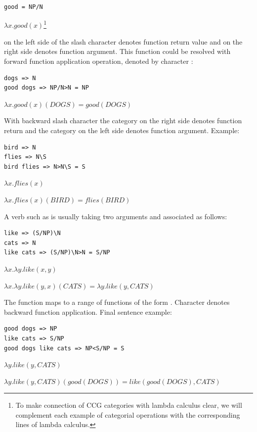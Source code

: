 \begin{verbatim}
good = NP/N 
\end{verbatim}

$\lambda x.good(x)$\footnote{To make connection of CCG categories with lambda calculus clear, we will complement each example of categorial operations with the corresponding lines of lambda calculus.}

 on the left side of the slash character denotes function return value and  on the right side denotes function argument. This function could be resolved with forward function application operation, denoted by character \code{>}:

\begin{verbatim}
dogs => N
good dogs => NP/N>N = NP
\end{verbatim}

$\lambda x.good(x)(DOGS)=good(DOGS)$

With backward slash character \code{\textbackslash} the category on the right side denotes function return and the category on the left side denotes function argument. Example:

\begin{verbatim}
bird => N
flies => N\S
bird flies => N>N\S = S
\end{verbatim}

$\lambda x.flies(x)$

$\lambda x.flies(x)(BIRD)=flies(BIRD) $

A verb such as  is usually taking two arguments and associated as follows:

\begin{verbatim}
like => (S/NP)\N
cats => N
like cats => (S/NP)\N>N = S/NP
\end{verbatim}

$\lambda x.\lambda y.like(x, y)$

$\lambda x.\lambda y.like(y, x)(CATS)=\lambda y.like(y, CATS)$

The function  maps  to a range of functions of the form .  Character \code{<} denotes backward function application. Final sentence example:

\begin{verbatim}
good dogs => NP
like cats => S/NP
good dogs like cats => NP<S/NP = S
\end{verbatim}

$\lambda y.like(y, CATS)$

$\lambda y.like(y, CATS)(good(DOGS))=like(good(DOGS), CATS)$

